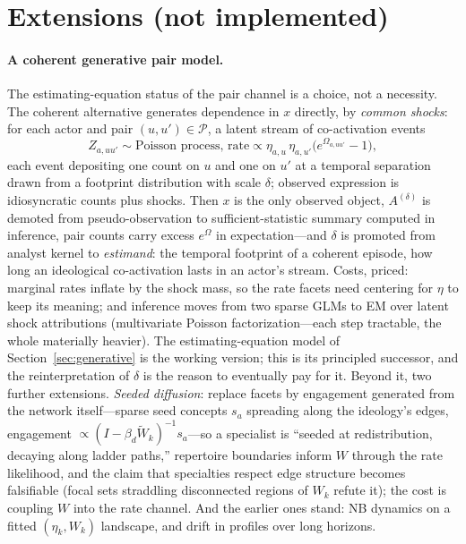 \documentclass[11pt]{article}
\newcommand{\PP}{\mathcal{P}}
\newcommand{\1}{\mathbb{1}}
\newcommand{\Wt}{\widetilde{W}}
\begin{document}
\section{Extensions (not implemented)}\label{sec:extensions}

\paragraph{A coherent generative pair model.}

The estimating-equation status of the pair channel is a choice, not a necessity. The coherent alternative generates dependence in $x$ directly, by \emph{common shocks}: for each actor and pair $(u,u')\in\PP$, a latent stream of co-activation events
\[
  Z_{a,uu'} \sim \text{Poisson process, rate} \propto \eta_{a,u}\,\eta_{a,u'}\big(e^{\Omega_{a,uu'}}-1\big),
\]
each event depositing one count on $u$ and one on $u'$ at a temporal separation drawn from a footprint distribution with scale $\delta$; observed expression is idiosyncratic counts plus shocks. Then $x$ is the only observed object, $A^{(\delta)}$ is demoted from pseudo-observation to sufficient-statistic summary computed in inference, pair counts carry excess $e^{\Omega}$ in expectation---and $\delta$ is promoted from analyst kernel to \emph{estimand}: the temporal footprint of a coherent episode, how long an ideological co-activation lasts in an actor's stream. Costs, priced: marginal rates inflate by the shock mass, so the rate facets need centering for $\eta$ to keep its meaning; and inference moves from two sparse GLMs to EM over latent shock attributions (multivariate Poisson factorization---each step tractable, the whole materially heavier). The estimating-equation model of Section~\ref{sec:generative} is the working version; this is its principled successor, and the reinterpretation of $\delta$ is the reason to eventually pay for it. Beyond it, two further extensions. \emph{Seeded diffusion}: replace facets by engagement generated from the network itself---sparse seed concepts $s_a$ spreading along the ideology's edges, engagement $\propto(I-\beta_d\Wt_{k})^{-1}s_a$---so a specialist is ``seeded at redistribution, decaying along ladder paths,'' repertoire boundaries inform $W$ through the rate likelihood, and the claim that specialties respect edge structure becomes falsifiable (focal sets straddling disconnected regions of $W_k$ refute it); the cost is coupling $W$ into the rate channel. And the earlier ones stand: NB dynamics on a fitted $(\eta_k,W_k)$ landscape, and drift in profiles over long horizons.
\end{document}

